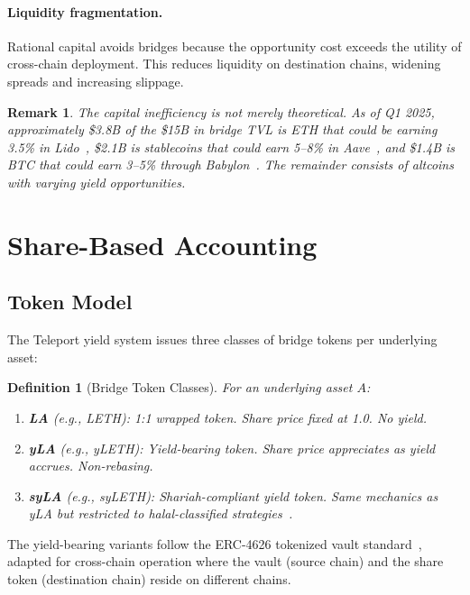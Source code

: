 \documentclass[11pt,twocolumn]{article}
\newtheorem{definition}{Definition}[section]
\newtheorem{remark}{Remark}[section]
\begin{document}
\paragraph{Liquidity fragmentation.} Rational capital avoids bridges because the opportunity cost exceeds the utility of cross-chain deployment. This reduces liquidity on destination chains, widening spreads and increasing slippage.

\begin{remark}
The capital inefficiency is not merely theoretical. As of Q1 2025, approximately \$3.8B of the \$15B in bridge TVL is ETH that could be earning 3.5\% in Lido~\cite{lidofinance}, \$2.1B is stablecoins that could earn 5--8\% in Aave~\cite{aavev3}, and \$1.4B is BTC that could earn 3--5\% through Babylon~\cite{babylon2024}. The remainder consists of altcoins with varying yield opportunities.
\end{remark}

\section{Share-Based Accounting}\label{sec:share}

\subsection{Token Model}

The Teleport yield system issues three classes of bridge tokens per underlying asset:

\begin{definition}[Bridge Token Classes]
For an underlying asset $A$:
\begin{enumerate}[nosep]
  \item \textbf{LA} (e.g., LETH): 1:1 wrapped token. Share price fixed at 1.0. No yield.
  \item \textbf{yLA} (e.g., yLETH): Yield-bearing token. Share price appreciates as yield accrues. Non-rebasing.
  \item \textbf{syLA} (e.g., syLETH): Shariah-compliant yield token. Same mechanics as yLA but restricted to halal-classified strategies~\cite{luxteleport}.
\end{enumerate}
\end{definition}

The yield-bearing variants follow the ERC-4626 tokenized vault standard~\cite{erc4626}, adapted for cross-chain operation where the vault (source chain) and the share token (destination chain) reside on different chains.
\end{document}
